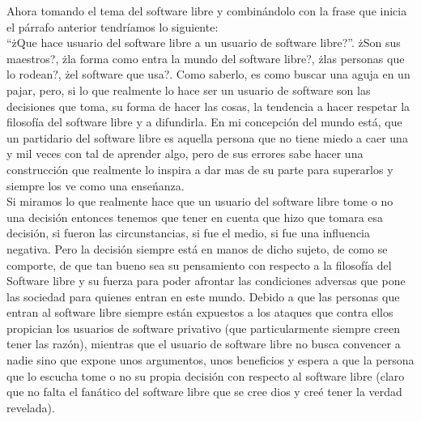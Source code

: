 \begin{multicols}{2}
Ahora tomando el tema del software libre y combinándolo con la frase que inicia el párrafo anterior tendríamos lo siguiente:\\
``żQue hace usuario del software libre a un usuario de software libre?''. żSon sus maestros?, żla forma como entra la mundo del 
software libre?, żlas personas que lo rodean?, żel software que usa?. Como saberlo, es como buscar una aguja en un pajar, pero, 
si lo que realmente lo hace ser un usuario de software son las decisiones que toma, su forma de hacer las cosas, la tendencia 
a hacer respetar la filosofía del software libre y a difundirla. En mi concepción del mundo está, que un partidario del software 
libre es aquella persona que no tiene miedo a caer una y mil veces con tal de aprender algo, pero de sus errores sabe hacer una 
construcción que realmente lo inspira a dar mas de su parte para superarlos y siempre los ve como una enseńanza. \\

Si miramos lo que realmente hace que un usuario del software libre tome o no una decisión entonces tenemos que tener en cuenta 
que hizo que tomara esa decisión, si fueron las circunstancias, si fue el medio, si fue una influencia negativa. Pero la decisión
siempre está en manos de dicho sujeto, de como se comporte, de que tan bueno sea su pensamiento con respecto a la filosofía del 
Software libre y su fuerza para poder afrontar las condiciones adversas que pone las sociedad para quienes entran en este mundo. 
Debido a que las personas que entran al software libre siempre están expuestos a los ataques que contra ellos propician los 
usuarios de software privativo (que particularmente siempre creen tener las razón), mientras que el usuario de software libre 
no busca convencer a nadie sino que expone unos argumentos, unos beneficios y espera a que la persona que lo escucha tome o no 
su propia decisión con respecto al software libre (claro que no falta el fanático del software libre que se cree dios y creé tener
la verdad revelada).





\end{multicols}
